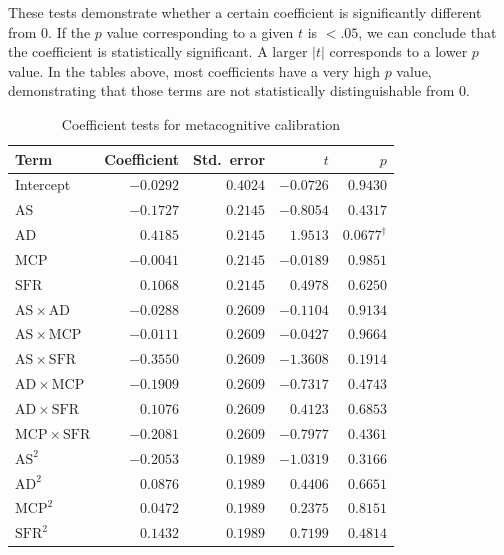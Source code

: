 \documentclass[12pt]{article}
\begin{document}

These tests demonstrate whether a certain coefficient is significantly different from $0$. If the $p$ value corresponding to a given $t$ is $<.05$, we can conclude that the coefficient is statistically significant. A larger $|t|$ corresponds to a lower $p$ value. In the tables above, most coefficients have a very high $p$ value, demonstrating that those terms are not statistically distinguishable from $0$.



\begin{table}[htbp]
\centering
\small
\caption{Coefficient tests for metacognitive calibration}
\label{tab:coef-mc}
\begin{tabular}{lrrrr}
\toprule
Term & Coefficient & Std.\ error & $t$ & $p$ \\
\midrule
Intercept                         & $-0.0292$ & $0.4024$ & $-0.0726$ & $0.9430$ \\
$\mathrm{AS}$                     & $-0.1727$ & $0.2145$ & $-0.8054$ & $0.4317$ \\
$\mathrm{AD}$                     & $ 0.4185$ & $0.2145$ & $ 1.9513$ & $0.0677^{\dagger}$ \\
$\mathrm{MCP}$                    & $-0.0041$ & $0.2145$ & $-0.0189$ & $0.9851$ \\
$\mathrm{SFR}$                    & $ 0.1068$ & $0.2145$ & $ 0.4978$ & $0.6250$ \\
$\mathrm{AS}\times\mathrm{AD}$    & $-0.0288$ & $0.2609$ & $-0.1104$ & $0.9134$ \\
$\mathrm{AS}\times\mathrm{MCP}$   & $-0.0111$ & $0.2609$ & $-0.0427$ & $0.9664$ \\
$\mathrm{AS}\times\mathrm{SFR}$   & $-0.3550$ & $0.2609$ & $-1.3608$ & $0.1914$ \\
$\mathrm{AD}\times\mathrm{MCP}$   & $-0.1909$ & $0.2609$ & $-0.7317$ & $0.4743$ \\
$\mathrm{AD}\times\mathrm{SFR}$   & $ 0.1076$ & $0.2609$ & $ 0.4123$ & $0.6853$ \\
$\mathrm{MCP}\times\mathrm{SFR}$  & $-0.2081$ & $0.2609$ & $-0.7977$ & $0.4361$ \\
$\mathrm{AS}^{2}$                 & $-0.2053$ & $0.1989$ & $-1.0319$ & $0.3166$ \\
$\mathrm{AD}^{2}$                 & $ 0.0876$ & $0.1989$ & $ 0.4406$ & $0.6651$ \\
$\mathrm{MCP}^{2}$                & $ 0.0472$ & $0.1989$ & $ 0.2375$ & $0.8151$ \\
$\mathrm{SFR}^{2}$                & $ 0.1432$ & $0.1989$ & $ 0.7199$ & $0.4814$ \\
\bottomrule
\end{tabular}

\medskip

\end{table}
\end{document}
